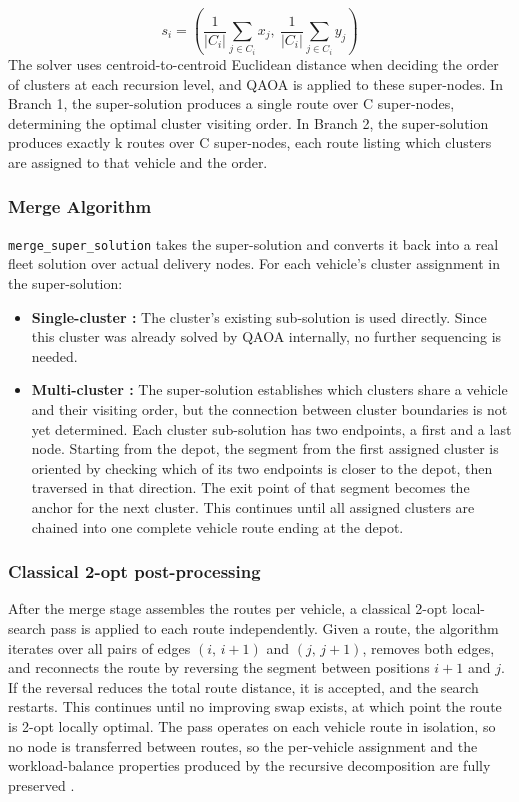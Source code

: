 \documentclass[a4paper]{report}
\begin{document}
{\begin{itemize}
\begin{equation}
s_i = \left(\frac{1}{|C_i|}\sum_{j \in C_i} x_j,\ \frac{1}{|C_i|}
\sum_{j \in C_i} y_j\right)
\end{equation}
The solver uses centroid-to-centroid Euclidean distance when deciding the order of clusters at each recursion level, and QAOA is applied to these super-nodes. 
In Branch 1, the super-solution produces a single route over C super-nodes, determining the optimal cluster visiting order. In Branch 2, the super-solution produces exactly k routes over C super-nodes, each route listing which clusters are assigned to that vehicle and the order.




\subsubsection{Merge Algorithm}

\texttt{merge\_super\_solution} takes the super-solution and converts it 
back into a real fleet solution over actual delivery nodes. For each 
vehicle's cluster assignment in the super-solution:

\begin{itemize}
    \item \textbf{Single-cluster :} The cluster's existing 
    sub-solution is used directly. Since this cluster was already solved 
    by QAOA internally, no further sequencing is needed.
    
\item \textbf{Multi-cluster :} The super-solution establishes 
which clusters share a vehicle and their visiting order, but the 
connection between cluster boundaries is not yet determined. Each 
cluster sub-solution has two endpoints, a first and a last node. 
Starting from the depot, the segment from the first assigned cluster 
is oriented by checking which of its two endpoints is closer to the 
depot, then traversed in that direction. The exit point of that 
segment becomes the anchor for the next cluster. This continues until all assigned 
clusters are chained into one complete vehicle route ending at 
the depot.
    
\end{itemize}
\subsubsection{Classical 2-opt post-processing}
After the merge stage assembles the routes per vehicle, a classical 2-opt local-search pass is applied to each route independently. Given a route, the algorithm iterates over all pairs of edges $(i,\, i+1)$ and $(j,\, j+1)$, removes both edges, and reconnects the route by reversing the segment between positions $i+1$ and $j$. If the reversal reduces the total route distance, it is accepted, and the search restarts. This continues until no improving swap exists, at which point the route is 2-opt locally optimal. The pass operates on each vehicle route in isolation, so no node is transferred between routes, so the per-vehicle assignment and the workload-balance properties produced by the recursive decomposition are fully preserved \cite{lin1973effective}.


\end{itemize}}
\end{document}
